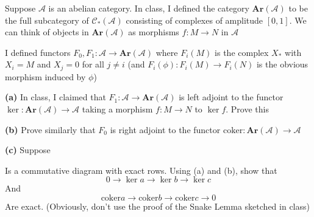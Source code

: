 \documentclass{article}
\newenvironment{exercise}[2][Exercise]{\begin{trivlist}
\item[\hskip \labelsep {\bfseries #1}\hskip \labelsep {\bfseries #2.}]}{\end{trivlist}}
\theoremstyle{definition}
\theoremstyle{remark}
\theoremstyle{definition}
\begin{document}
\begin{exercise}{\textbf{2}}
Suppose $\mathscr A$ is an abelian category. In class, I defined the category $\mathbf{Ar}(\mathscr A)$ to be the full subcategory of $\mathscr C_*(\mathscr A)$  consisting of complexes of amplitude $[0,1]$. We can think of objects in $\mathbf{Ar}(\mathscr A)$ as morphisms $f:M\to N$ in $\mathscr A$ \par
I defined functors $F_0,F_1:\mathscr A\to\mathbf{Ar}(\mathscr A)$ where $F_i(M)$ is the complex $X_*$ with $X_i=M$ and $X_j=0$ for all $j\neq i$ (and $F_i(\phi):F_i(M)\to F_i(N)$ is the obvious morphism induced by $\phi$) \par
\textbf{(a) }In class, I claimed that $F_1:\mathscr A\to\mathbf{Ar}(\mathscr A)$ is left adjoint to the functor $\ker:\mathbf{Ar}(\mathscr A)\to\mathscr A$ taking a morphism $f:M\to N$ to $\ker f$. Prove this \par
\textbf{(b) }Prove similarly that $F_0$ is right adjoint to the functor $\mathrm{coker}:\mathbf{Ar}(\mathscr A)\to\mathscr A$ \par
\textbf{(c) }Suppose
\begin{center}
\end{center}
Is a commutative diagram with exact rows. Using (a) and (b), show that
\[0\to\ker a\to\ker b\to\ker c\]
 And
 \[\mathrm{coker}a\to\mathrm{coker}b\to\mathrm{coker}c\to0\]
 Are exact. (Obviously, don't use the proof of the Snake Lemma sketched in class)
\end{exercise}
\end{document}
